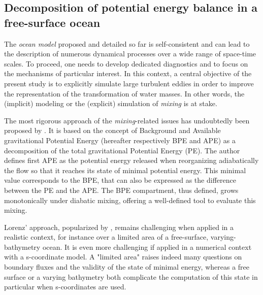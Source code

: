 

\subsection{Decomposition of potential energy balance in a free-surface ocean}

The \textit{ocean model} proposed and detailed so far is self-consistent and can lead to the description of numerous dynamical processes over a wide range of space-time scales. To proceed, one needs to develop dedicated diagnostics and to focus on the mechanisms of particular interest. In this context, a central objective of the present study is to explicitly simulate large turbulent eddies in order to improve the representation of the transformation of water masses. In other words, the (implicit) modeling or the (explicit) simulation of \textit{mixing} is at stake.

The most rigorous approach of the \textit{mixing}-related issues has undoubtedly been proposed by \cite{lorenz_available_1955}. It is based on the concept of Background and Available gravitational Potential Energy (hereafter respectively BPE and APE) as a decomposition of the total gravitational Potential Energy (PE). The author defines first APE as the potential energy released when reorganizing adiabatically the flow so that it reaches its state of minimal potential energy. This minimal value corresponds to the BPE, that can also be expressed as the difference between the PE and the APE. The BPE compartment, thus defined, grows monotonically under diabatic mixing, offering a well-defined tool to evaluate this mixing.

Lorenz' approach, popularized by \cite{winters_available_1995}, remains challenging when applied in a realistic context, for instance over a limited area of a free-surface, varying-bathymetry ocean. It is even more challenging if applied in a numerical context with a s-coordinate model. A "limited area" raises indeed many questions on boundary fluxes and the validity of the state of minimal energy, whereas a free surface or a varying bathymetry both complicate the computation of this state in particular when s-coordinates are used.


